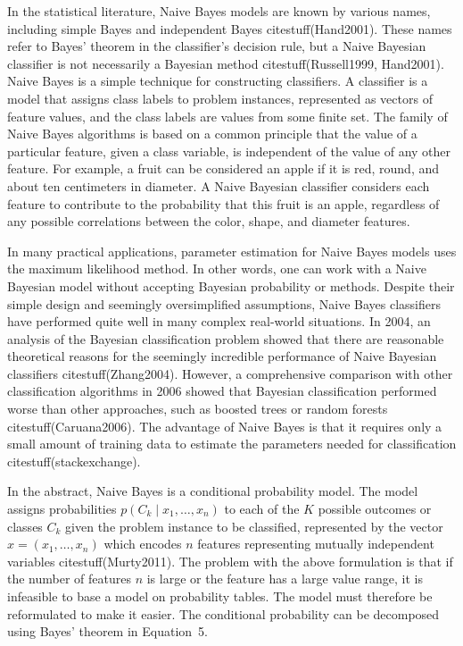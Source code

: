 \documentclass[preprint,12pt]{elsarticle}
\begin{document}
In the statistical literature, Naive Bayes models are known by various names, including simple Bayes and independent Bayes citestuff(Hand2001). These names refer to Bayes' theorem in the classifier's decision rule, but a Naive Bayesian classifier is not necessarily a Bayesian method citestuff(Russell1999, Hand2001). Naive Bayes is a simple technique for constructing classifiers. A classifier is a model that assigns class labels to problem instances, represented as vectors of feature values, and the class labels are values from some finite set. The family of Naive Bayes algorithms is based on a common principle that the value of a particular feature, given a class variable, is independent of the value of any other feature. For example, a fruit can be considered an apple if it is red, round, and about ten centimeters in diameter. A Naive Bayesian classifier considers each feature to contribute to the probability that this fruit is an apple, regardless of any possible correlations between the color, shape, and diameter features.

In many practical applications, parameter estimation for Naive Bayes models uses the maximum likelihood method. In other words, one can work with a Naive Bayesian model without accepting Bayesian probability or methods. Despite their simple design and seemingly oversimplified assumptions, Naive Bayes classifiers have performed quite well in many complex real-world situations. In 2004, an analysis of the Bayesian classification problem showed that there are reasonable theoretical reasons for the seemingly incredible performance of Naive Bayesian classifiers citestuff(Zhang2004). However, a comprehensive comparison with other classification algorithms in 2006 showed that Bayesian classification performed worse than other approaches, such as boosted trees or random forests citestuff(Caruana2006). The advantage of Naive Bayes is that it requires only a small amount of training data to estimate the parameters needed for classification citestuff(stackexchange).

In the abstract, Naive Bayes is a conditional probability model. The model assigns probabilities $p(C_{k}\mid x_{1},\ldots, x_{n})$ to each of the $K$ possible outcomes or classes $C_{k}$ given the problem instance to be classified, represented by the vector $x = (x_{1},\ldots, x_{n})$ which encodes $n$ features representing mutually independent variables citestuff(Murty2011). The problem with the above formulation is that if the number of features $n$ is large or the feature has a large value range, it is infeasible to base a model on probability tables. The model must therefore be reformulated to make it easier. The conditional probability can be decomposed using Bayes' theorem in Equation~5.
\end{document}
